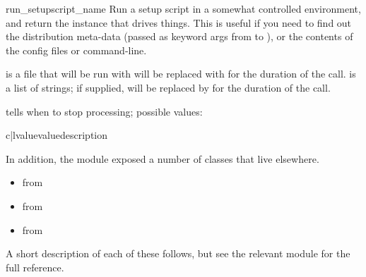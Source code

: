 \documentclass{manual}
\begin{document}
\begin{funcdesc}{run_setup}{script_name}
Run a setup script in a somewhat controlled environment, and return 
the  instance that drives things.  
This is useful if you need to find out the distribution meta-data 
(passed as keyword args from  to ), or 
the contents of the config files or command-line.

 is a file that will be run with 
 will be replaced with  for the duration of the
call.   is a list of strings; if supplied,
 will be replaced by  for the duration 
of the call.

 tells  when to stop processing; possible 
values:

\begin{tableii}{c|l}{value}{value}{description}
\end{tableii}
\end{funcdesc}

In addition, the  module exposed a number of 
classes that live elsewhere.

\begin{itemize}
\item {} from 
\item {} from 
\item {} from 
\end{itemize}

A short description of each of these follows, but see the relevant
module for the full reference.
\end{document}
